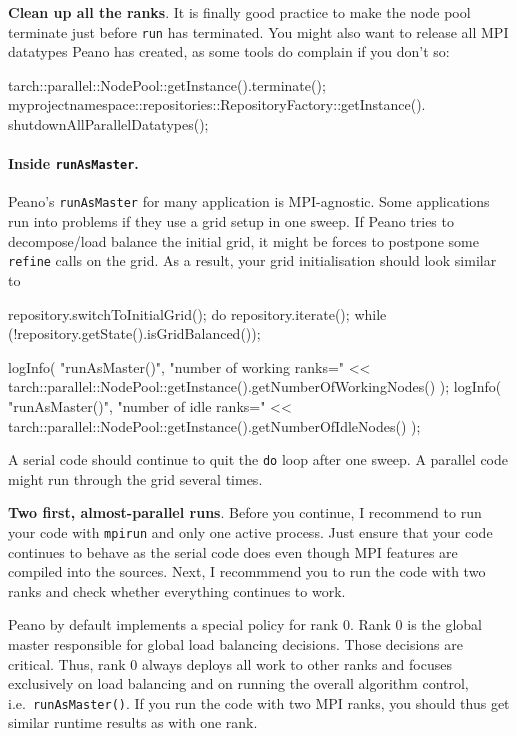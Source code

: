 \noindent
{\bf Clean up all the ranks}.
It is finally good practice to make the node pool terminate just before
\texttt{run} has terminated.
You might also want to release all MPI datatypes Peano has created, as some
tools do complain if you don't so:

\begin{code}
tarch::parallel::NodePool::getInstance().terminate();
myprojectnamespace::repositories::RepositoryFactory::getInstance().
  shutdownAllParallelDatatypes();
\end{code}



\paragraph{Inside \texttt{runAsMaster}.}
Peano's \texttt{runAsMaster} for many application is MPI-agnostic.
Some applications run into problems if they use a grid setup in one sweep.
If Peano tries to decompose/load balance the initial grid, it might be forces to
postpone some \texttt{refine} calls on the grid. 
As a result, your grid initialisation should look similar to
\begin{code}
repository.switchToInitialGrid();
do {
  repository.iterate();
} while (!repository.getState().isGridBalanced());

logInfo(
  "runAsMaster()",
  "number of working ranks=" << 
  tarch::parallel::NodePool::getInstance().getNumberOfWorkingNodes() 
);
logInfo(
  "runAsMaster()",
  "number of idle ranks=" << tarch::parallel::NodePool::getInstance().getNumberOfIdleNodes()
);

\end{code}

\noindent
A serial code should continue to quit the \texttt{do} loop after one sweep. 
A parallel code might run through the grid several times.

\noindent
{\bf Two first, almost-parallel runs}.
Before you continue, I recommend to run your code with \texttt{mpirun} and only
one active process. 
Just ensure that your code continues to behave as the serial code does even
though MPI features are compiled into the sources.
Next, I recommmend you to run the code with two ranks and check whether
everything continues to work.

\begin{remark}
Peano by default implements a special policy for rank 0. Rank 0 is the global
master responsible for global load balancing decisions. Those decisions are
critical. 
Thus, rank 0 always deploys all work to other ranks and focuses exclusively on
load balancing and on running the overall algorithm control,
i.e.~\texttt{runAsMaster()}.
If you run the code with two MPI ranks, you should thus get similar runtime
results as with one rank.
\end{remark}
 
